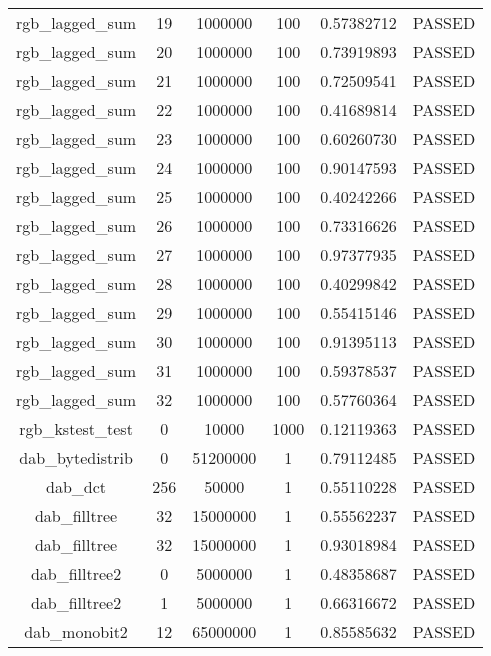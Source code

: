 \begin{longtable}{cccccc}
rgb\_lagged\_sum & 19 & 1000000 & 100 & 0.57382712 & PASSED \\
rgb\_lagged\_sum & 20 & 1000000 & 100 & 0.73919893 & PASSED \\
rgb\_lagged\_sum & 21 & 1000000 & 100 & 0.72509541 & PASSED \\
rgb\_lagged\_sum & 22 & 1000000 & 100 & 0.41689814 & PASSED \\
rgb\_lagged\_sum & 23 & 1000000 & 100 & 0.60260730 & PASSED \\
rgb\_lagged\_sum & 24 & 1000000 & 100 & 0.90147593 & PASSED \\
rgb\_lagged\_sum & 25 & 1000000 & 100 & 0.40242266 & PASSED \\
rgb\_lagged\_sum & 26 & 1000000 & 100 & 0.73316626 & PASSED \\
rgb\_lagged\_sum & 27 & 1000000 & 100 & 0.97377935 & PASSED \\
rgb\_lagged\_sum & 28 & 1000000 & 100 & 0.40299842 & PASSED \\
rgb\_lagged\_sum & 29 & 1000000 & 100 & 0.55415146 & PASSED \\
rgb\_lagged\_sum & 30 & 1000000 & 100 & 0.91395113 & PASSED \\
rgb\_lagged\_sum & 31 & 1000000 & 100 & 0.59378537 & PASSED \\
rgb\_lagged\_sum & 32 & 1000000 & 100 & 0.57760364 & PASSED \\
rgb\_kstest\_test & 0 & 10000 & 1000 & 0.12119363 & PASSED \\
dab\_bytedistrib & 0 & 51200000 & 1 & 0.79112485 & PASSED \\
dab\_dct & 256 & 50000 & 1 & 0.55110228 & PASSED \\
dab\_filltree & 32 & 15000000 & 1 & 0.55562237 & PASSED \\
dab\_filltree & 32 & 15000000 & 1 & 0.93018984 & PASSED \\
dab\_filltree2 & 0 & 5000000 & 1 & 0.48358687 & PASSED \\
dab\_filltree2 & 1 & 5000000 & 1 & 0.66316672 & PASSED \\
dab\_monobit2 & 12 & 65000000 & 1 & 0.85585632 & PASSED \\
\bottomrule
\end{longtable}

